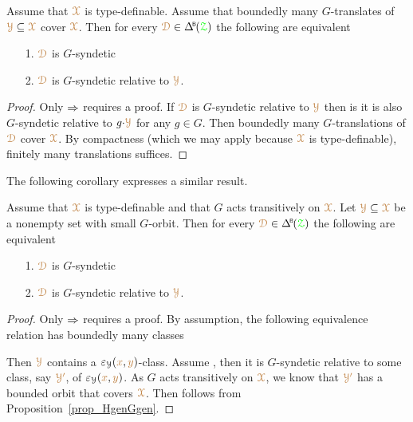 \begin{proposition}\label{prop_HgenGgen}
  Assume that ${\color{brown}\EuScript X}$ is type-definable.
  Assume that boundedly many $G$-translates of ${\color{brown}\EuScript Y}\subseteq{\color{brown}\EuScript X}$ cover ${\color{brown}\EuScript X}$.
  Then for every $\mrD\in\BDelta(\grZ)$ the following are equivalent
  \begin{itemize}
    \item [1.] ${\color{brown}\EuScript D}$ is $G$-syndetic
    \item [2.] ${\color{brown}\EuScript D}$ is $G$-syndetic relative to ${\color{brown}\EuScript Y}$.
  \end{itemize}
\end{proposition}

\begin{proof}
  Only $\Rightarrow$ requires a proof.
  If ${\color{brown}\EuScript D}$ is $G$-syndetic relative to ${\color{brown}\EuScript Y}$ then is it is also $G$-syndetic relative to $g{\cdot}{\color{brown}\EuScript Y}$ for any $g\in G$.
  Then boundedly many $G$-translations of ${\color{brown}\EuScript D}$ cover ${\color{brown}\EuScript X}$.
  By compactness (which we may apply because ${\color{brown}\EuScript X}$ is type-definable), finitely many translations suffices.
\end{proof}

The following corollary expresses a similar result.

\begin{corollary}\label{corol_bounded_orbit_syndetic}
  Assume that ${\color{brown}\EuScript X}$ is type-definable and that $G$ acts transitively on ${\color{brown}\EuScript X}$.
  Let ${\color{brown}\EuScript Y}\subseteq{\color{brown}\EuScript X}$ be a nonempty set with small $G$-orbit.
  Then for every $\mrD\in\BDelta(\grZ)$ the following are equivalent
  \begin{itemize}
    \item [1.] ${\color{brown}\EuScript D}$ is $G$-syndetic
    \item [2.] ${\color{brown}\EuScript D}$ is $G$-syndetic relative to ${\color{brown}\EuScript Y}$.
  \end{itemize}
\end{corollary}

\begin{proof}
  Only $\Rightarrow$ requires a proof.
  By assumption, the following equivalence relation has boundedly many classes
  
  
  Then ${\color{brown}\EuScript Y}$ contains a $\varepsilon_\EuScript Y({\color{brown} x},{\color{brown} y})$-class.
  Assume , then it is $G$-syndetic relative to some class, say ${\color{brown}\EuScript Y'}$, of $\varepsilon_\EuScript Y({\color{brown} x},{\color{brown} y})$.
  As $G$ acts transitively on ${\color{brown}\EuScript X}$, we know that ${\color{brown}\EuScript Y'}$ has a bounded orbit that covers ${\color{brown}\EuScript X}$.
  Then  follows from Proposition~\ref{prop_HgenGgen}.
\end{proof}

